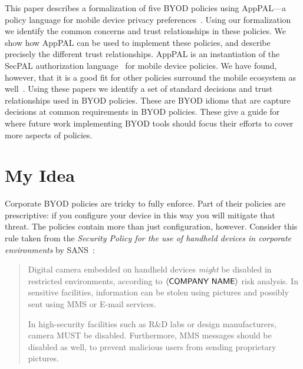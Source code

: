 \documentclass{article}
\begin{document}
This paper describes a formalization of five BYOD policies using AppPAL---a policy language for mobile device privacy preferences~\cite{hallett_apppal_2016}.
Using our formalization we identify the common concerns and trust relationships in these policies.
We show how AppPAL can be used to implement these policies, and describe precisely the different trust relationships.
AppPAL is an instantiation of the SecPAL authorization language~\cite{becker_secpal:_2010} for mobile device policies.
We have found, however, that it is a good fit for other policies surround the mobile ecosystem as well~\cite{hallett_specifying_2016}.
Using these papers we identify a set of standard decisions and trust relationships used in BYOD policies.
These are BYOD idioms that are capture decisions at common requirements in BYOD policies.
These give a guide for where future work implementing BYOD tools should focus their efforts to cover more aspects of policies.

\section{My Idea}
\label{sec:idea}

Corporate BYOD policies are tricky to fully enforce.
Part of their policies are prescriptive:  if you configure your device in this way you will mitigate that threat.
The policies contain more than just configuration, however.
Consider this rule taken from the \emph{Security Policy for the use of handheld devices in corporate environments} by SANS~\cite{nicholas_r._c._guerin_security_2008}:

\newcommand{\textbra}[1]{\ensuremath{\left\langle \text{\sffamily #1} \right\rangle}}
\begin{quote}
  Digital camera embedded on handheld devices \emph{might} be disabled in restricted environments, according to \textbra{COMPANY NAME} risk analysis. 
  In sensitive facilities, information can be stolen using pictures and possibly sent using MMS or E-mail services.

  In high-security facilities such as R\&D labs or design manufacturers, camera MUST be disabled.
  Furthermore, MMS messages should be disabled as well, to prevent malicious users from sending proprietary pictures.
\end{quote}
\end{document}
